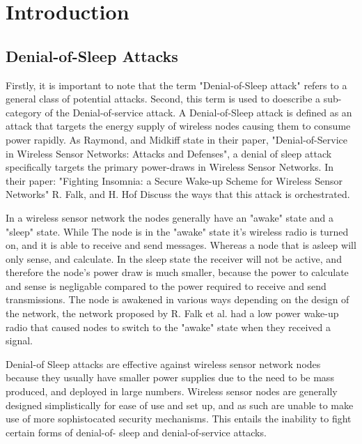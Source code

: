 \section{Introduction}

\subsection{Denial-of-Sleep Attacks}
 
Firstly, it is important to note that the term "Denial-of-Sleep attack" refers to a general class of potential attacks. Second, this term is used to doescribe a sub-category of the Denial-of-service attack. A Denial-of-Sleep 
attack is defined as an attack that targets the energy supply of wireless nodes causing them to consume power rapidly. As Raymond, and Midkiff state in their paper, "Denial-of-Service in Wireless Sensor Networks: 
Attacks and Defenses", a denial of sleep attack specifically targets the primary power-draws in Wireless Sensor Networks\cite{4431860}. In their paper: "Fighting Insomnia: a Secure Wake-up Scheme for Wireless Sensor Networks" 
R. Falk, and H. Hof Discuss the ways that this attack is orchestrated\cite{5211020}. 

In a wireless sensor network the nodes generally have an "awake" state and a "sleep" state\cite{5211020}. While The node is in the "awake" state it's wireless radio is turned on, and it is able to receive and send messages. 
Whereas a node that is asleep will only  sense, and calculate. In the sleep state the receiver will not be active, and therefore the node's power draw is much smaller, because the power to calculate and sense is negligable 
compared to the power required to receive and send transmissions. The node is awakened in various ways depending on the design of the network, the network proposed by R. Falk et al. had a low power wake-up radio that caused nodes
to switch to the "awake" state when they received a signal. 

Denial-of Sleep attacks are effective against wireless sensor network nodes because they usually have smaller power supplies due to the need to be mass produced, and deployed in large numbers\cite{4602623}. Wireless sensor 
nodes are generally designed simplistically for ease of use and set up, and as such are unable to make use of more sophistocated security mechanisms\cite{4476299}. This entails the inability to fight certain forms of denial-of-
sleep and denial-of-service attacks.


